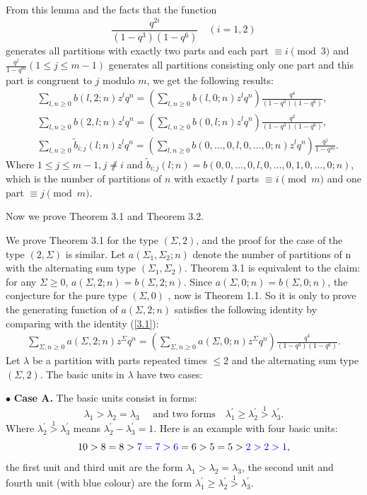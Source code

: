 \documentclass[draft]{amsart}
\numberwithin{equation}{section}
\theoremstyle{plain}
\theoremstyle{remark}
\begin{document}
\noindent From this lemma and the facts that the function
$$ \frac{q^{2i}}{(1-q^{3})(1-q^{6})} \quad (i=1, 2) $$ 
generates all partitions with exactly two parts and each part $\equiv i\pmod 3$ and 
$\frac{q^{j}}{1-q^{m}}(1\leq j\leq m-1)$ generates all partitions consisting only one part and this part is congruent to $j$ modulo $m$,
we get the following results:
\begin{align}
&\sum_{l, n\geq 0}b(l, 2; n)z^{l}q^{n}=\left(\sum_{l, n\geq 0}b(l,0; n)z^{l}q^{n} \right)\frac{q^{4}}{(1-q^{3})(1-q^{6})},\label{3.1}\\
&\sum_{l, n\geq 0}b(2, l; n)z^{l}q^{n}=\left(\sum_{l, n\geq 0}b(0, l; n)z^{l}q^{n} \right)\frac{q^{2}}{(1-q^{3})(1-q^{6})},\label{3.2}\\
&\sum_{l, n\geq 0}\tilde{b}_{i; j}(l;n)z^{l}q^{n}=\left(\sum_{l, n\geq 0}b(0,\dots,0,l,0,\dots, 0;n)z^{l}q^{n} \right)\frac{q^{j}}{1-q^{m}}.\label{3.3}
\end{align}
Where $1\leq j\leq m-1, j\not\neq i$ and $\tilde{b}_{i;j}(l;n)=b(0,0,\dots, 0, l ,0,\dots,0,1,0,\dots,0; n)$, which is the number of partitions of $n$ with exactly $l$ parts
$\equiv i \pmod m$ and one part $\equiv j \pmod m$.

Now we prove Theorem 3.1 and Theorem 3.2.


We prove Theorem 3.1 for the type $(\Sigma, 2)$, and the proof for the case of the type $(2, \Sigma)$ is similar. Let $a(\Sigma_{1}, \Sigma_{2};  n)$ denote the number of partitions of n with the alternating sum type
$(\Sigma_{1},  \Sigma_{2})$. Theorem 3.1 is equivalent to the claim:  for any $\Sigma \geq 0$, $a(\Sigma, 2;  n)=b(\Sigma, 2; n)$. Since $a(\Sigma, 0;  n)=b(\Sigma, 0; n)$, the conjecture for the pure type $(\Sigma,0)$ , now is Theorem 1.1. So it is only to prove the generating function of $a(\Sigma, 2; n)$ satisfies the following identity by comparing with the identity (\ref{3.1}):
\begin{align}
\sum_{\Sigma, n\geq 0}a(\Sigma, 2;n)z^{\Sigma}q^{n}=\left(\sum_{\Sigma, n\geq 0}a(\Sigma, 0 ;n)z^{\Sigma}q^{n} \right)\frac{q^{4}}{(1-q^{3})(1-q^{6})}.
\end{align}
Let $\lambda$ be a partition with parts repeated times $\leq 2$ and the alternating sum type $(\Sigma, 2)$. The basic units in 
$\lambda$ have two cases:

$\bullet$ \textbf{ Case A.}\label{Case A} The basic units  consist in forms:
$$
\lambda_{1} >\lambda_{2}=\lambda_{3} \quad \mbox{ and  two forms}\quad \lambda_{1}^{\prime}\geq \lambda_{2}^{\prime}\overset{1}{>}\lambda_{3}^{\prime}.
$$ 
Where $\lambda_{2}^{\prime}\overset{1}{>}\lambda_{3}^{\prime}$ means $\lambda_{2}^{\prime}-\lambda_{3}^{\prime}=1$.  Here is an example with four basic units:
$$
10>8=8 >{\color{blue}7=7>6}     =6>5=5 >{\color{blue}2>2>1},$$ the first  unit and third unit are the form $\lambda_{1} >\lambda_{2}=\lambda_{3} $, the second unit and fourth unit (with blue colour) are the form $\lambda_{1}^{\prime}\geq \lambda_{2}^{\prime}\overset{1}{>}\lambda_{3}^{\prime}.$
\end{document}
